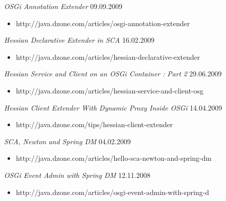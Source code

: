 \documentclass{res}
\begin{document}
\begin{resume}
{{\sl OSGi Annotation Extender}  \hfill    09.09.2009	\\
\vspace{-5mm}  \begin{itemize}
\item[]  \scriptsize http://java.dzone.com/articles/osgi-annotation-extender
\end{itemize}
\vspace{-2mm}

{\sl Hessian Declarative Extender in SCA}  \hfill   16.02.2009\\
\vspace{-5mm}  \begin{itemize}
\item[]  \scriptsize http://java.dzone.com/articles/hessian-declarative-extender
\end{itemize}
\vspace{-2mm}

{\sl Hessian Service and Client on an OSGi Container : Part 2}  \hfill   29.06.2009	\\
\vspace{-5mm}  \begin{itemize}
\item[]  \scriptsize http://java.dzone.com/articles/hessian-service-and-client-osg
\end{itemize}
\vspace{-2mm}

{\sl Hessian Client Extender With Dynamic Proxy Inside OSGi}  \hfill   14.04.2009	\\
\vspace{-5mm}  \begin{itemize}
\item[]  \scriptsize http://java.dzone.com/tips/hessian-client-extender
\end{itemize}
\vspace{-2mm}

{\sl SCA, Newton and Spring DM}  \hfill    04.02.2009	\\
\vspace{-5mm}  \begin{itemize}
\item[]  \scriptsize http://java.dzone.com/articles/hello-sca-newton-and-spring-dm
\end{itemize}
\vspace{-2mm}

{\sl OSGi Event Admin with Spring DM}  \hfill   12.11.2008 \\
\vspace{-5mm}  \begin{itemize}
\item[]  \scriptsize http://java.dzone.com/articles/osgi-event-admin-with-spring-d
\end{itemize}
\vspace{-2mm}

}
\end{resume}
\end{document}
